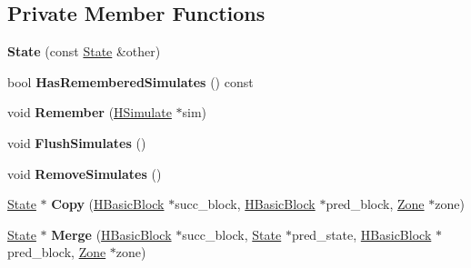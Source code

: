 \subsection*{Private Member Functions}
\begin{DoxyCompactItemize}
\item 
{\bfseries State} (const \hyperlink{classv8_1_1internal_1_1_state}{State} \&other)\hypertarget{classv8_1_1internal_1_1_state_a9bb0023e9dce9acb03d225cb639827b2}{}\label{classv8_1_1internal_1_1_state_a9bb0023e9dce9acb03d225cb639827b2}

\item 
bool {\bfseries Has\+Remembered\+Simulates} () const \hypertarget{classv8_1_1internal_1_1_state_af4c689101b224d1066beb9fc09100549}{}\label{classv8_1_1internal_1_1_state_af4c689101b224d1066beb9fc09100549}

\item 
void {\bfseries Remember} (\hyperlink{classv8_1_1internal_1_1_h_simulate}{H\+Simulate} $\ast$sim)\hypertarget{classv8_1_1internal_1_1_state_a2bd4e386693eefdce1823d63de17fcef}{}\label{classv8_1_1internal_1_1_state_a2bd4e386693eefdce1823d63de17fcef}

\item 
void {\bfseries Flush\+Simulates} ()\hypertarget{classv8_1_1internal_1_1_state_a2bc35f9e6389b46649fcef12547febf1}{}\label{classv8_1_1internal_1_1_state_a2bc35f9e6389b46649fcef12547febf1}

\item 
void {\bfseries Remove\+Simulates} ()\hypertarget{classv8_1_1internal_1_1_state_a34ca9558965840b26894049fba590343}{}\label{classv8_1_1internal_1_1_state_a34ca9558965840b26894049fba590343}

\item 
\hyperlink{classv8_1_1internal_1_1_state}{State} $\ast$ {\bfseries Copy} (\hyperlink{classv8_1_1internal_1_1_h_basic_block}{H\+Basic\+Block} $\ast$succ\+\_\+block, \hyperlink{classv8_1_1internal_1_1_h_basic_block}{H\+Basic\+Block} $\ast$pred\+\_\+block, \hyperlink{classv8_1_1internal_1_1_zone}{Zone} $\ast$zone)\hypertarget{classv8_1_1internal_1_1_state_a21f74a26c3a5fcaa4ec3a40829477e31}{}\label{classv8_1_1internal_1_1_state_a21f74a26c3a5fcaa4ec3a40829477e31}

\item 
\hyperlink{classv8_1_1internal_1_1_state}{State} $\ast$ {\bfseries Merge} (\hyperlink{classv8_1_1internal_1_1_h_basic_block}{H\+Basic\+Block} $\ast$succ\+\_\+block, \hyperlink{classv8_1_1internal_1_1_state}{State} $\ast$pred\+\_\+state, \hyperlink{classv8_1_1internal_1_1_h_basic_block}{H\+Basic\+Block} $\ast$pred\+\_\+block, \hyperlink{classv8_1_1internal_1_1_zone}{Zone} $\ast$zone)\hypertarget{classv8_1_1internal_1_1_state_ac4c10e86680c70135309d1065df20f1e}{}\label{classv8_1_1internal_1_1_state_ac4c10e86680c70135309d1065df20f1e}

\end{DoxyCompactItemize}
